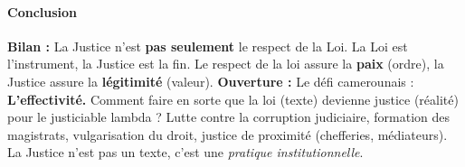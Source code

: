 \documentclass[11pt]{article}
\begin{document}
\begin{exoresolu}
    \paragraph{Conclusion}
    \textbf{Bilan :} La Justice n'est \textbf{pas seulement} le respect de la Loi. La Loi est l'instrument, la Justice est la fin. Le respect de la loi assure la \textbf{paix} (ordre), la Justice assure la \textbf{légitimité} (valeur).
    \textbf{Ouverture :} Le défi camerounais : \textbf{L'effectivité.} Comment faire en sorte que la loi (texte) devienne justice (réalité) pour le justiciable lambda ? Lutte contre la corruption judiciaire, formation des magistrats, vulgarisation du droit, justice de proximité (chefferies, médiateurs). La Justice n'est pas un texte, c'est une \emph{pratique institutionnelle}.
\end{exoresolu}
\end{document}
